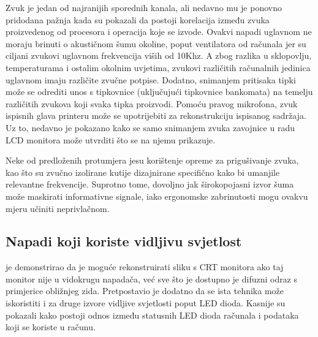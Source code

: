 \documentclass[times, utf8, diplomski]{fer}
\begin{document}
Zvuk je jedan od najranijih sporednih kanala, ali nedavno mu je ponovno pridodana pažnja kada su \cite{shamir2004acoustic} pokazali da postoji korelacija između zvuka proizvedenog od procesora i operacija koje se izvode. Ovakvi napadi uglavnom ne moraju brinuti o akustičnom šumu okoline, poput ventilatora od računala jer su ciljani zvukovi uglavnom frekvencija viših od 10Khz. A zbog razlika u sklopovlju, temperaturama i ostalim okolnim uvjetima, zvukovi različitih računalnih jedinica uglavnom imaju različite zvučne potpise. Dodatno, snimanjem pritisaka tipki može se odrediti unos s tipkovnice (uključujući tipkovnice bankomata) na temelju različitih zvukova koji svaka tipka proizvodi. Pomoću pravog mikrofona, zvuk ispisnih glava printeru može se upotrijebiti za rekonstrukciju ispisanog sadržaja. Uz to, nedavno je pokazano kako se samo snimanjem zvuka zavojnice  u radu LCD monitora može utvrditi što se na njemu prikazuje.

Neke od predloženih protumjera jesu korištenje opreme za prigušivanje zvuka, kao što su zvučno izolirane kutije dizajnirane specifično kako bi umanjile relevantne frekvencije. Suprotno tome, dovoljno jak širokopojasni izvor šuma može maskirati informativne signale, iako ergonomske zabrinutosti mogu ovakvu mjeru učiniti neprivlačnom.

\subsection{Napadi koji koriste vidljivu svjetlost}
\cite{kuhn2002optical} je demonstrirao da je moguće rekonstruirati sliku s CRT monitora ako taj monitor nije u vidokrugu napadača, već sve što je dostupno je difuzni odraz s primjerice obližnjeg zida. Pretpostavio je dodatno da se ista tehnika može iskoristiti i za druge izvore vidljive svjetlosti poput LED dioda. Kasnije su \cite{loughry2002information} pokazali kako postoji odnos između statusnih LED dioda računala i podataka koji se koriste u računu.
\end{document}
